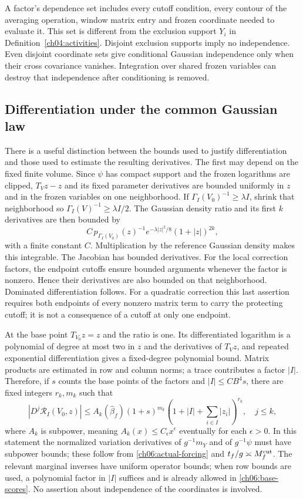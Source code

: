 A factor's dependence set includes every cutoff condition, every contour of the averaging operation,
window matrix entry and frozen coordinate needed to evaluate it. This set
is different from the exclusion support $Y_i$ in
Definition~\ref{ch04:activities}. Disjoint exclusion supports imply no
independence. Even disjoint coordinate sets give conditional Gaussian
independence only when their cross covariance vanishes. Integration over
shared frozen variables can destroy that independence after conditioning
is removed.

\subsection{Differentiation under the common Gaussian law}

There is a useful distinction between the bounds used to justify
differentiation and those used to estimate the resulting derivatives.
The first may depend on the fixed finite volume. Since $\psi$ has
compact support and the frozen logarithms are clipped,
$T_Vz-z$ and its fixed parameter derivatives are bounded uniformly in
$z$ and in the frozen variables on one neighborhood. If
$\Gamma_I(V_0)^{-1}\ge\lambda I$, shrink that neighborhood so
$\Gamma_I(V)^{-1}\ge\lambda I/2$. The Gaussian density ratio and its
first $k$ derivatives are then bounded by
\[
 C\,p_{\Gamma_I(V_0)}(z)^{-1}
       e^{-\lambda|z|^2/8}(1+|z|)^{2k},
\]
with a finite constant $C$. Multiplication by the reference Gaussian
density makes this integrable. The Jacobian has bounded derivatives.
For the local correction factors, the endpoint cutoffs ensure bounded
arguments whenever the factor is nonzero. Hence their derivatives are
also bounded on that neighborhood. Dominated differentiation follows.
For a quadratic correction this last assertion requires both endpoints
of every nonzero matrix term to carry the protecting cutoff; it is not
a consequence of a cutoff at only one endpoint.

At the base point $T_{V_0}z=z$ and the ratio is one. Its differentiated
logarithm is a polynomial of degree at most two in $z$ and the
derivatives of $T_Vz$, and repeated exponential differentiation gives
a fixed-degree polynomial bound. Matrix products are estimated in row
and column norms; a trace contributes a factor $|I|$. Therefore, if $s$ counts the
base points of the factors and $|I|\le C B^4s$, there are fixed integers $r_k,m_k$
such that
\begin{equation}
 |D^j\mathcal R_I(V_0,z)|
 \le A_k(\widehat\beta_f)(1+s)^{m_k}
             (1+|I|+\sum_{i\in I}|z_i|)^{r_k},\quad j\le k,
 \label{ch06:base-scores}
\end{equation}
where $A_k$ is subpower, meaning
$A_k(x)\le C_\epsilon x^\epsilon$ eventually for each $\epsilon>0$.
In this statement the normalized variation derivatives of $g^{-1}m_Y$
and of $g^{-1}\psi$ must have subpower bounds; these follow from
\eqref{ch06:actual-forcing} and $t_f/g\asymp M_f^{\rm cut}$.
The relevant marginal inverses have uniform operator bounds; when
row bounds are used, a polynomial factor in $|I|$ suffices and is
already allowed in \eqref{ch06:base-scores}. No assertion about
independence of the coordinates is involved.


